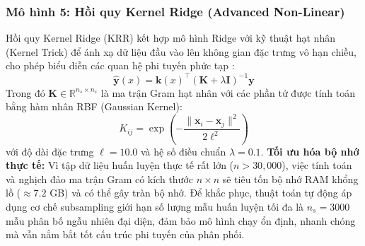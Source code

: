 \documentclass[12pt,a4paper]{article}
\begin{document}
\subsubsection{Mô hình 5: Hồi quy Kernel Ridge (Advanced Non-Linear)}
Hồi quy Kernel Ridge (KRR) kết hợp mô hình Ridge với kỹ thuật hạt nhân (Kernel Trick) để ánh xạ dữ liệu đầu vào lên không gian đặc trưng vô hạn chiều, cho phép biểu diễn các quan hệ phi tuyến phức tạp \cite{bishop}:
\begin{equation}
    \hat{\mathbf{y}}(x) = \mathbf{k}(x)^\top (\mathbf{K} + \lambda \mathbf{I})^{-1} \mathbf{y}
\end{equation}
Trong đó $\mathbf{K} \in \mathbb{R}^{n_s \times n_s}$ là ma trận Gram hạt nhân với các phần tử được tính toán bằng hàm nhân RBF (Gaussian Kernel):
\begin{equation}
    K_{ij} = \exp\left(-\frac{\|\mathbf{x}_i - \mathbf{x}_j\|^2}{2\ell^2}\right)
\end{equation}
với độ dài đặc trưng $\ell = 10.0$ và hệ số điều chuẩn $\lambda = 0.1$.
\textbf{Tối ưu hóa bộ nhớ thực tế:} Vì tập dữ liệu huấn luyện thực tế rất lớn ($n > 30,000$), việc tính toán và nghịch đảo ma trận Gram có kích thước $n \times n$ sẽ tiêu tốn bộ nhớ RAM khổng lồ ($\approx 7.2$ GB) và có thể gây tràn bộ nhớ. Để khắc phục, thuật toán tự động áp dụng cơ chế subsampling giới hạn số lượng mẫu huấn luyện tối đa là $n_s = 3000$ mẫu phân bố ngẫu nhiên đại diện, đảm bảo mô hình chạy ổn định, nhanh chóng mà vẫn nắm bắt tốt cấu trúc phi tuyến của phân phối.
\end{document}

